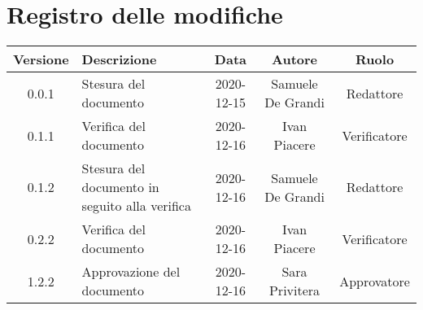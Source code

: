 \section*{Registro delle modifiche}

\begin{center}
	\begin{longtable}{|c|p{5cm}|c|c|c|}
	\hline
	\rowcolor{lighter-grayer}
	\textbf{Versione} & \textbf{Descrizione} & \textbf{Data} & \textbf{Autore} & \textbf{Ruolo} \\
	\hline
	\endfirsthead


		\hline
	0.0.1 & Stesura del documento & 2020-12-15 & Samuele De Grandi & Redattore \\
	\hline
	0.1.1 & Verifica del documento & 2020-12-16 & Ivan Piacere & Verificatore \\
	\hline
	0.1.2 & Stesura del documento in seguito alla verifica & 2020-12-16 & Samuele De Grandi & Redattore \\
	\hline
	0.2.2 & Verifica del documento & 2020-12-16 & Ivan Piacere & Verificatore \\
	\hline
	1.2.2 & Approvazione del documento & 2020-12-16 & Sara Privitera & Approvatore \\
	\hline
    
	\end{longtable}
\end{center}
